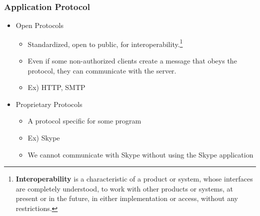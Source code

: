 \subsubsection{Application Protocol}
\begin{itemize}
	\item Open Protocols
	\begin{itemize}
		\item Standardized, open to public, for interoperability.\footnote{\textbf{Interoperability} is a characteristic of a product or system, whose interfaces are completely understood, to work with other products or systems, at present or in the future, in either implementation or access, without any restrictions.}
		\item Even if some non-authorized clients create a message that obeys the protocol, they can communicate with the server.
		\item Ex) HTTP, SMTP
	\end{itemize}
	\item Proprietary Protocols
	\begin{itemize}
		\item A protocol specific for some program
		\item Ex) Skype
		\item We cannot communicate with Skype without using the Skype application
	\end{itemize}
\end{itemize}

